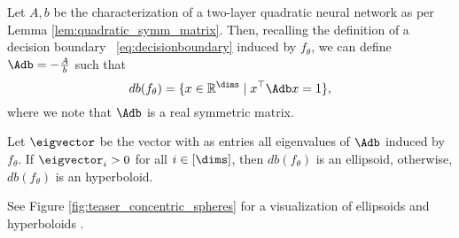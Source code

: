 Let $A, b$ be the characterization of a two-layer quadratic neural
network as per Lemma \ref{lem:quadratic_symm_matrix}. Then, recalling
the definition of a decision boundary ~\eqref{eq:decisionboundary}
induced by $f_\theta$, we can define $\Adb= -\frac{A}{b}$ such that
\begin{equation}
\label{db_quadrnetwork}
db(f_\theta) = \{ x \in \mathbb{R}^{\dims} \mid x^{\top} \Adb x = 1 \},
\end{equation}
where we note that $\Adb$ is a real symmetric matrix.
\begin{fact}
  Let $\eigvector$ be the vector with as entries all eigenvalues of
  $\Adb$ induced by $f_{\theta}$. If $\eigvector_{i} > 0$ for all $i
  \in [\dims]$, then $db(f_{\theta})$ is an ellipsoid, otherwise,
  $db(f_{\theta})$ is an hyperboloid.
\end{fact}




 See Figure
\ref{fig:teaser_concentric_spheres} for a visualization of ellipsoids and hyperboloids . 





